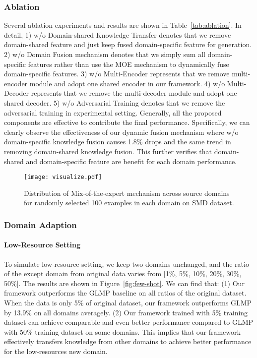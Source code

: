 \documentclass[11pt,a4paper]{article}
\begin{document}
\subsubsection{Ablation}
Several ablation experiments and results are shown in Table~\ref{tab:ablation}.
In detail, 1) w/o Domain-shared Knowledge Transfer denotes that we remove domain-shared feature and just keep fused domain-specific feature for generation.
2) w/o Domain Fusion mechanism denotes that we simply sum all domain-specific features rather than use the MOE mechanism to dynamically fuse domain-specific features.
3) w/o Multi-Encoder represents that we remove multi-encoder module and adopt one shared encoder in our framework.
4) w/o Multi-Decoder represents that we remove the multi-decoder module and adopt one shared decoder.
5) w/o Adversarial Training denotes that we remove the adversarial training in experimental setting.
Generally, all the proposed components are effective to contribute the final performance.
Specifically, we can clearly observe the effectiveness of our dynamic fusion mechanism where w/o domain-specific knowledge fusion causes 1.8\% drops and the same trend in removing domain-shared knowledge fusion.
This further verifies that domain-shared and domain-specific feature are benefit for each domain performance.
\begin{figure}[t]
	\centering
\texttt{[image: visualize.pdf]}
	\caption{
		Distribution of Mix-of-the-expert mechanism across source domains for randomly selected 100 examples in each domain on SMD dataset.
	}
	\label{fig:visualize}
\end{figure}
\subsubsection{Domain Adaption}
\paragraph{Low-Resource Setting}
To simulate low-resource setting, we keep two domains unchanged, and the ratio of the except domain from original data varies from [1\%, 5\%, 10\%, 20\%, 30\%, 50\%].
The results are shown in Figure~\ref{fig:few-shot}.
We can find that:
(1) Our framework outperforms the GLMP baseline on all ratios of the original dataset.
When the data is only 5\% of original dataset, our framework outperforms GLMP by 13.9\% on all domains averagely.
(2) Our framework trained with 5\% training dataset can achieve comparable and even better performance compared to GLMP with 50\% training dataset on some domains.
This implies that our framework effectively transfers knowledge from  other domains to achieve better performance for the low-resources new domain.
\end{document}
